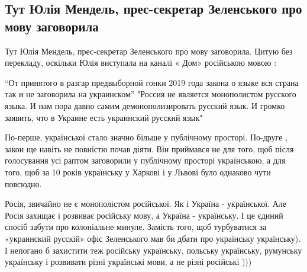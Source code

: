  
 
 
 
 

\subsection{Тут Юлія Мендель, прес-секретар Зеленського про мову заговорила}
\label{sec:06_04_2021.fb.promovugroup.1.mova_jazyk}

Тут Юлія Мендель, прес-секретар Зеленського про мову заговорила. Цитую без
перекладу, оскільки Юлія виступала на каналі « Дом» російською мовою : 

“От принятого в разгар предвыборной гонки 2019 года закона о языке вся страна
так и не заговорила на украинском” "Россия не является монополистом русского
языка. И нам пора давно самим демонополизировать русский язык. И громко
заявить, что в Украине есть украинский русский язык"

По-перше, української стало значно більше у публічному просторі. По-друге ,
закон ще навіть не повністю почав діяти. Він приймався не для того, щоб після
голосування усі раптом заговорили у публічному просторі українською, а для
того, щоб за 10 років українську у Харкові і у Львові було однаково чути
повсюдно. 

Росія, звичайно не є монополістом російської. Як і Україна - української. Але
Росія захищає і розвиває російську мову, а Україна - українську. І це єдиний
спосіб забути про колоніальне минуле. Замість того, щоб турбуватися за
«украинский русскій» офіс Зеленського мав би дбати про українську українську).
І непогано б захистити теж російську українську, польську українську, румунську
українську і розвивати різні українські мови, а не різні російські )))
